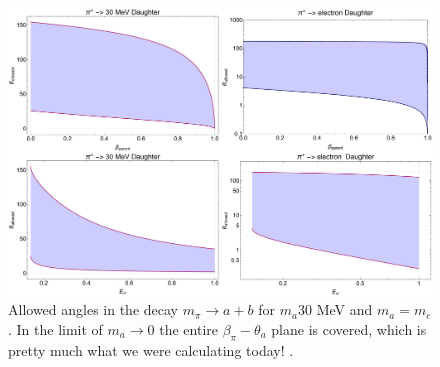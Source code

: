 \documentclass[11pt, a4paper]{article}
\begin{document}
\begin{enumerate}
%
	\end{enumerate}

\begin{figure}[t]
\center
\includegraphics[width=1.0\textwidth]{figures/angles_boost.pdf}
\caption{\label{fig:boost} Allowed angles in the decay $m_\pi \rightarrow a+b$ for $m_a 30$ MeV and $m_a=m_e$. In the limit of $m_a \rightarrow 0$ the entire $\beta_\pi - \theta_a$ plane is covered, which is pretty much what we were calculating today!   .}
\end{figure}
\end{document}
